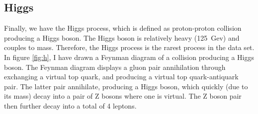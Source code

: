\subsection*{Higgs}
Finally, we have the Higgs process, which is defined as proton-proton collision producing a Higgs boson. The Higgs boson is relatively heavy (125~Gev) and couples to mass. Therefore, the 
Higgs process is the rarest process in the data set. In figure \ref{fig:h}, I have drawn a Feynman diagram of a collision producing a Higgs boson. The Feynman diagram displays a gluon pair annihilation
through exchanging a virtual top quark, and producing a virtual top quark-antiquark pair. The latter pair annihilate, producing a Higgs boson, which quickly (due to its mass) decay into a 
pair of Z bosons where one is virtual. The Z boson pair then further decay into a total of 4 leptons. 

